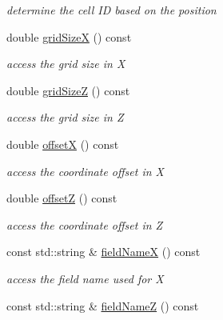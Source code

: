 \begin{DoxyCompactItemize}
\begin{DoxyCompactList}\small\item\em determine the cell ID based on the position \item\end{DoxyCompactList}\item 
double \hyperlink{class_d_d4hep_1_1_d_d_segmentation_1_1_cartesian_grid_x_z_a8177655fb094b8874faf15c754057f92}{gridSizeX} () const 
\begin{DoxyCompactList}\small\item\em access the grid size in X \item\end{DoxyCompactList}\item 
double \hyperlink{class_d_d4hep_1_1_d_d_segmentation_1_1_cartesian_grid_x_z_a03673d1debc555efed18d828d269c935}{gridSizeZ} () const 
\begin{DoxyCompactList}\small\item\em access the grid size in Z \item\end{DoxyCompactList}\item 
double \hyperlink{class_d_d4hep_1_1_d_d_segmentation_1_1_cartesian_grid_x_z_adc83460c3aa0d1bd311f758ee09987cb}{offsetX} () const 
\begin{DoxyCompactList}\small\item\em access the coordinate offset in X \item\end{DoxyCompactList}\item 
double \hyperlink{class_d_d4hep_1_1_d_d_segmentation_1_1_cartesian_grid_x_z_a0ac0582e3c6952e32a42f6fc461a7437}{offsetZ} () const 
\begin{DoxyCompactList}\small\item\em access the coordinate offset in Z \item\end{DoxyCompactList}\item 
const std::string \& \hyperlink{class_d_d4hep_1_1_d_d_segmentation_1_1_cartesian_grid_x_z_a80a5d5e1b6b9fb57b02883e84eec88cf}{fieldNameX} () const 
\begin{DoxyCompactList}\small\item\em access the field name used for X \item\end{DoxyCompactList}\item 
const std::string \& \hyperlink{class_d_d4hep_1_1_d_d_segmentation_1_1_cartesian_grid_x_z_a632e941a62b52d78235198d042f43802}{fieldNameZ} () const 

\end{DoxyCompactItemize}
